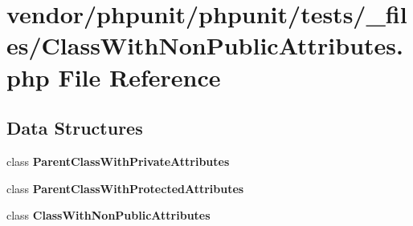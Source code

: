 \section{vendor/phpunit/phpunit/tests/\+\_\+files/\+Class\+With\+Non\+Public\+Attributes.php File Reference}
\label{_class_with_non_public_attributes_8php}
\subsection*{Data Structures}
\begin{DoxyCompactItemize}
\item 
class {\bf Parent\+Class\+With\+Private\+Attributes}
\item 
class {\bf Parent\+Class\+With\+Protected\+Attributes}
\item 
class {\bf Class\+With\+Non\+Public\+Attributes}
\end{DoxyCompactItemize}
